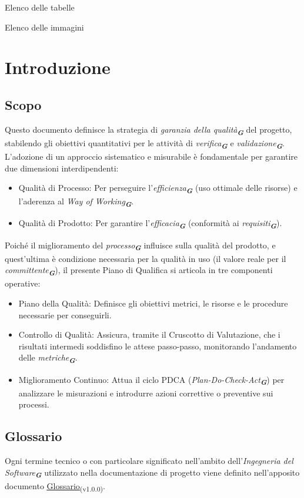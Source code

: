 \documentclass[a4paper,12pt]{article}
\newcommand{\glossario}[1]{\textit{#1}\textsubscript{\textbf{\textit{\textcolor{lightblack}{G}}}}}
\newcommand{\ped}[1]{\textsubscript{#1}}
\renewcommand{\listoftables}{Elenco delle tabelle}
\renewcommand{\listoffigures}{Elenco delle immagini}
\begin{document}
\tableofcontents
\newpage

\listoftables
\newpage

\listoffigures
\newpage

\section{Introduzione}

\subsection{Scopo}
Questo documento definisce la strategia di \glossario{garanzia della qualità} del progetto, stabilendo gli obiettivi quantitativi per le attività di \glossario{verifica} e \glossario{validazione}. L'adozione di un approccio sistematico e misurabile è fondamentale per garantire due dimensioni interdipendenti:
\begin{itemize}
    \item Qualità di Processo: Per perseguire l'\glossario{efficienza} (uso ottimale delle risorse) e l'aderenza al \glossario{Way of Working}.
    \item Qualità di Prodotto: Per garantire l'\glossario{efficacia} (conformità ai \glossario{requisiti}).
\end{itemize}

Poiché il miglioramento del \glossario{processo} influisce sulla qualità del prodotto, e quest'ultima è condizione necessaria per la qualità in uso (il valore reale per il \glossario{committente}), il presente Piano di Qualifica si articola in tre componenti operative:
\begin{itemize}
    \item Piano della Qualità: Definisce gli obiettivi metrici, le risorse e le procedure necessarie per conseguirli.
    \item Controllo di Qualità: Assicura, tramite il Cruscotto di Valutazione, che i risultati intermedi soddisfino le attese passo-passo, monitorando l'andamento delle \glossario{metriche}.
    \item Miglioramento Continuo: Attua il ciclo PDCA (\glossario{Plan-Do-Check-Act}) per analizzare le misurazioni e introdurre azioni correttive o preventive sui processi.
\end{itemize}


\subsection{Glossario}
Ogni termine tecnico o con particolare significato nell'ambito dell'\glossario{Ingegneria del Software} utilizzato nella documentazione di progetto viene definito nell'apposito documento \href{https://7-zpus.github.io/Docs/assets/2_RTB/DocumentiInterni/Glossario.pdf}{\ul{Glossario}}\ped{(v1.0.0)}.
\end{document}
